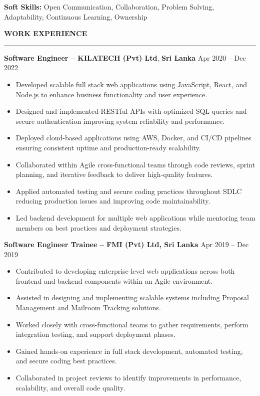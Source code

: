 \documentclass[10pt,letterpaper]{article}
\begin{document}
\textbf{Soft Skills:} Open Communication, Collaboration, Problem Solving, Adaptability, Continuous Learning, Ownership

\vspace{8pt}

\textbf{WORK EXPERIENCE}\\[-8pt]
\noindent\rule{\textwidth}{1pt}

\vspace{-2pt}

\textbf{Software Engineer -- KILATECH (Pvt) Ltd}, \textbf{Sri Lanka} \hfill Apr 2020 -- Dec 2022

\vspace{-1pt}

\begin{itemize}
\item Developed scalable full stack web applications using JavaScript, React, and Node.js to enhance business functionality and user experience.
\item Designed and implemented RESTful APIs with optimized SQL queries and secure authentication improving system reliability and performance.
\item Deployed cloud-based applications using AWS, Docker, and CI/CD pipelines ensuring consistent uptime and production-ready scalability.
\item Collaborated within Agile cross-functional teams through code reviews, sprint planning, and iterative feedback to deliver high-quality features.
\item Applied automated testing and secure coding practices throughout SDLC reducing production issues and improving code maintainability.
\item Led backend development for multiple web applications while mentoring team members on best practices and deployment strategies.
\end{itemize}

\textbf{Software Engineer Trainee -- FMI (Pvt) Ltd, Sri Lanka} \hfill Apr 2019 -- Dec 2019

\vspace{-1pt}

\begin{itemize}
\item Contributed to developing enterprise-level web applications across both frontend and backend components within an Agile environment.
\item Assisted in designing and implementing scalable systems including Proposal Management and Mailroom Tracking solutions.
\item Worked closely with cross-functional teams to gather requirements, perform integration testing, and support deployment phases.
\item Gained hands-on experience in full stack development, automated testing, and secure coding best practices.
\item Collaborated in project reviews to identify improvements in performance, scalability, and overall code quality.
\end{itemize}
\end{document}
